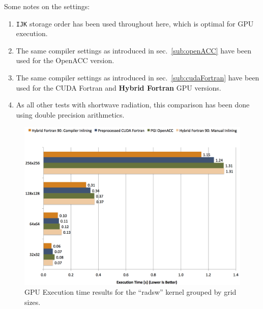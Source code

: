 Some notes on the settings: 
\begin{enumerate}
 \item \verb|IJK| storage order has been used throughout here, which is optimal for GPU execution.
 \item The same compiler settings as introduced in sec.~\ref{sub:openACC} have been used for the OpenACC version.
 \item The same compiler settings as introduced in sec.~\ref{sub:cudaFortran} have been used for the CUDA Fortran and \textbf{Hybrid Fortran} GPU versions.
 \item As all other tests with shortwave radiation, this comparison has been done using double precision arithmetics.
\end{enumerate}

\begin{figure}[htpb]
        \centering
        \includegraphics[width=14cm]{figures/verificationGPUExecTime}
        \caption[GPU Execution Time Results of Sample Implementation]{GPU Execution time results for the ``radsw'' kernel grouped by grid sizes.}
        \label{figure:verificationGPUExecTime}
\end{figure}

